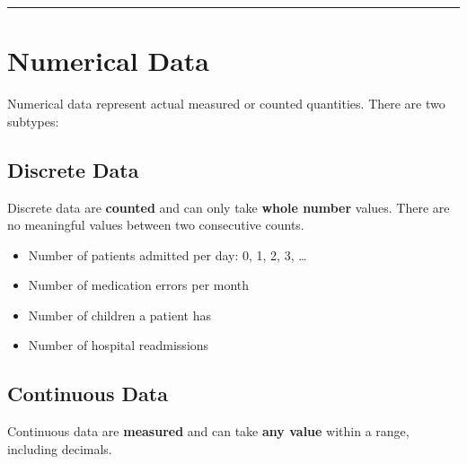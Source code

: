 \documentclass[
  12pt,
  letterpaper,
]{book}
\providecommand{\tightlist}{%
  \setlength{\itemsep}{0pt}\setlength{\parskip}{0pt}}
\begin{document}
\begin{center}\rule{0.5\linewidth}{0.5pt}\end{center}

\section{Numerical Data}\label{numerical-data}

Numerical data represent actual measured or counted quantities. There
are two subtypes:

\subsection{Discrete Data}\label{discrete-data}

Discrete data are \textbf{counted} and can only take \textbf{whole
number} values. There are no meaningful values between two consecutive
counts.

\begin{tcolorbox}[enhanced jigsaw, arc=.35mm, bottomrule=.15mm, bottomtitle=1mm, breakable, colback=white, colbacktitle=quarto-callout-tip-color!10!white, colframe=quarto-callout-tip-color-frame, coltitle=black, left=2mm, leftrule=.75mm, opacityback=0, opacitybacktitle=0.6, rightrule=.15mm, title={📋 Discrete Examples in Nursing}, titlerule=0mm, toprule=.15mm, toptitle=1mm]

\begin{itemize}
\tightlist
\item
  Number of patients admitted per day: 0, 1, 2, 3, \ldots{}
\item
  Number of medication errors per month
\item
  Number of children a patient has
\item
  Number of hospital readmissions
\end{itemize}

\end{tcolorbox}

\subsection{Continuous Data}\label{continuous-data}

Continuous data are \textbf{measured} and can take \textbf{any value}
within a range, including decimals.
\end{document}
